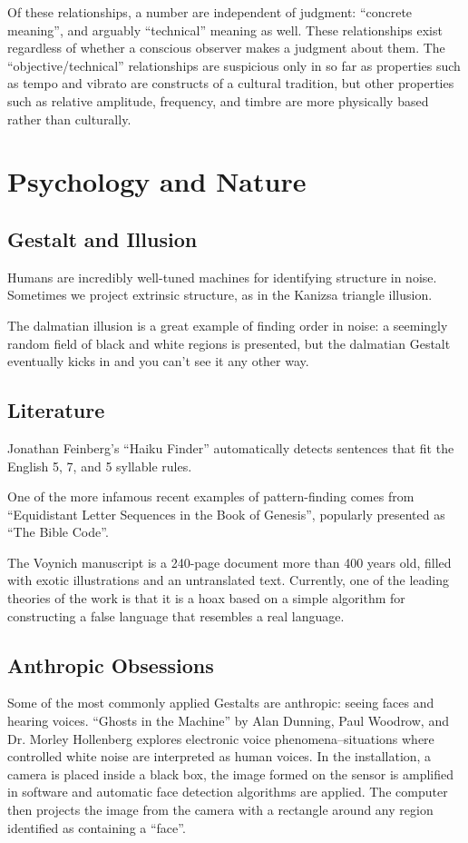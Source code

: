 \documentclass{thesis}
\begin{document}
	Of these relationships, a number are independent of judgment: ``concrete meaning'', and arguably ``technical'' meaning as well. These relationships exist regardless of whether a conscious observer makes a judgment about them. The ``objective/technical'' relationships are suspicious only in so far as properties such as tempo and vibrato are constructs of a cultural tradition, but other properties such as relative amplitude, frequency, and timbre are more physically based rather than culturally.

\section{Psychology and Nature}

\subsection{Gestalt and Illusion}
	Humans are incredibly well-tuned machines for identifying structure in noise. Sometimes we project extrinsic structure, as in the Kanizsa triangle illusion.\cite{alexander_bogomolny_kanizsa_????}
	
	The dalmatian illusion\cite{michael_bach_dalmatian_2002} is a great example of finding order in noise: a seemingly random field of black and white regions is presented, but the dalmatian Gestalt eventually kicks in and you can't see it any other way.
	
\subsection{Literature}
	Jonathan Feinberg's ``Haiku Finder''\cite{jonathan_feinberg_haiku_????} automatically detects sentences that fit the English 5, 7, and 5 syllable rules.
		
	One of the more infamous recent examples of pattern-finding comes from ``Equidistant Letter Sequences in the Book of Genesis''\cite{rips_equidistant_1994}, popularly presented as ``The Bible Code''.
	
	The Voynich manuscript is a 240-page document more than 400 years old, filled with exotic illustrations and an untranslated text. Currently, one of the leading theories of the work is that it is a hoax based on a simple algorithm for constructing a false language that resembles a real language.\cite{robin_mckie_secret_2004}
		
\subsection{Anthropic Obsessions}
	Some of the most commonly applied Gestalts are anthropic: seeing faces and hearing voices. ``Ghosts in the Machine'' by Alan Dunning, Paul Woodrow, and Dr. Morley Hollenberg\cite{alan_dunning_paul_woodrow_and_morley_hollenberg_einsteins_2008} explores electronic voice phenomena--situations where controlled white noise are interpreted as human voices. In the installation, a camera is placed inside a black box, the image formed on the sensor is amplified in software and automatic face detection algorithms are applied. The computer then projects the image from the camera with a rectangle around any region identified as containing a ``face''.
	
\end{document}
